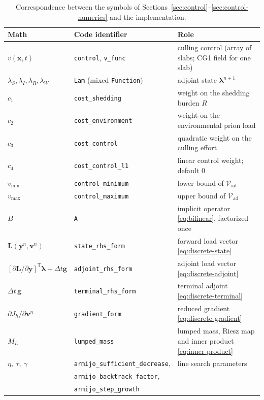 \documentclass[11pt]{article}
\newcommand{\Vad}{\mathcal{V}_{\mathrm{ad}}}
\begin{document}
\begin{table}[h]
\centering
\caption{Correspondence between the symbols of Sections~\ref{sec:control}--\ref{sec:control-numerics} and the implementation.}
\label{tab:control-notation}
\begin{tabular}{@{}lll@{}}
\toprule
Math & Code identifier & Role \\
\midrule
$v(\mathbf{x},t)$ & \texttt{control}, \texttt{v\_func} & culling control (array of slabs; CG1 field for one slab) \\
$\lambda_S,\lambda_I,\lambda_R,\lambda_W$ & \texttt{Lam} (mixed \texttt{Function}) & adjoint state $\boldsymbol\lambda^{n+1}$ \\
$c_1$ & \texttt{cost\_shedding} & weight on the shedding burden $R$ \\
$c_2$ & \texttt{cost\_environment} & weight on the environmental prion load \\
$c_3$ & \texttt{cost\_control} & quadratic weight on the culling effort \\
$c_4$ & \texttt{cost\_control\_l1} & linear control weight; default $0$ \\
$v_{\min}$ & \texttt{control\_minimum} & lower bound of $\Vad$ \\
$v_{\max}$ & \texttt{control\_maximum} & upper bound of $\Vad$ \\
$B$ & \texttt{A} & implicit operator \eqref{eq:bilinear}, factorized once \\
$\mathbf{L}(\mathbf{y}^n,\mathbf{v}^n)$ & \texttt{state\_rhs\_form} & forward load vector \eqref{eq:discrete-state} \\
$[\partial\mathbf{L}/\partial\mathbf{y}]^{\mathsf T}\boldsymbol\lambda + \Delta t\mathbf{g}$ & \texttt{adjoint\_rhs\_form} & adjoint load vector \eqref{eq:discrete-adjoint} \\
$\Delta t\,\mathbf{g}$ & \texttt{terminal\_rhs\_form} & terminal adjoint \eqref{eq:discrete-terminal} \\
$\partial J_h/\partial\mathbf{v}^n$ & \texttt{gradient\_form} & reduced gradient \eqref{eq:discrete-gradient} \\
$M_L$ & \texttt{lumped\_mass} & lumped mass, Riesz map and inner product \eqref{eq:inner-product} \\
$\eta,\ \tau,\ \gamma$ & \texttt{armijo\_sufficient\_decrease}, & line search parameters \\
 & \texttt{armijo\_backtrack\_factor}, & \\
 & \texttt{armijo\_step\_growth} & \\
\bottomrule
\end{tabular}
\end{table}
\end{document}
